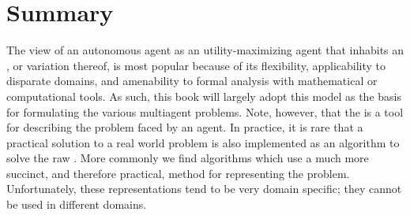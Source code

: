 \section{Summary}
\label{sec:summary}

The view of an autonomous agent as an utility-maximizing agent that
inhabits an , or variation thereof, is most popular because
of its flexibility, applicability to disparate domains, and
amenability to formal analysis with mathematical or computational
tools. As such, this book will largely adopt this model as the basis
for formulating the various multiagent problems. Note, however, that
the  is a tool for describing the problem faced by an agent.
In practice, it is rare that a practical solution to a real world
problem is also implemented as an algorithm to solve the raw
. More commonly we find algorithms which use a much more
succinct, and therefore practical, method for representing the
problem. Unfortunately, these representations tend to be very domain
specific; they cannot be used in different domains.

